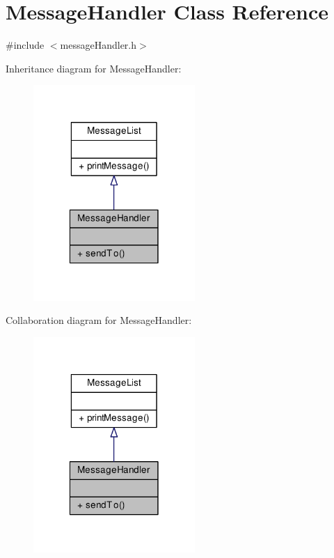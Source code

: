 \hypertarget{class_message_handler}{}\section{Message\+Handler Class Reference}
\label{class_message_handler}


{\ttfamily \#include $<$message\+Handler.\+h$>$}



Inheritance diagram for Message\+Handler\+:
\nopagebreak
\begin{figure}[H]
\begin{center}
\leavevmode
\includegraphics[width=174pt]{class_message_handler__inherit__graph}
\end{center}
\end{figure}


Collaboration diagram for Message\+Handler\+:
\nopagebreak
\begin{figure}[H]
\begin{center}
\leavevmode
\includegraphics[width=174pt]{class_message_handler__coll__graph}
\end{center}
\end{figure}
